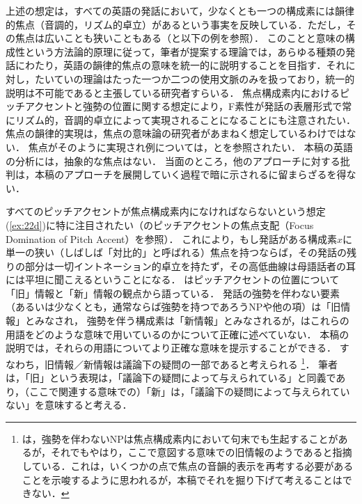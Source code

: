 \documentclass{goken}
\newcommand{\term}[2]{\textsf{#1}（#2）}
\newcommand{\ori}[1]{\noindent\textcolor[gray]{0.7}{\fontsize{8pt}{8pt}\selectfont{\textsf{(p.~#1)}}} }
\begin{document}
上述の想定は，すべての英語の発話において，少なくとも一つの構成素には韻律的焦点（音調的，リズム的卓立）があるという事実を反映している．ただし，その焦点は広いことも狭いこともある（\citealt{Ladd1980}と以下の例を参照）．
このことと意味の構成性という方法論的原理に従って，筆者が提案する理論では，あらゆる種類の発話にわたり，英語の韻律的焦点の意味を統一的に説明することを目指す．それに対し，たいていの理論はたった一つか二つの使用文脈のみを扱っており，統一的説明は不可能であると主張している研究者すらいる．
焦点構成素内におけるピッチアクセントと強勢の位置に関する想定により，F素性が発話の表層形式で常にリズム的，音調的卓立によって実現されることになることにも注意されたい．
焦点の韻律的実現は，焦点の意味論の研究者があまねく想定しているわけではない．
焦点がそのように実現され例については，\citealt{Partee1976}と\citealt{Krifka1992}を参照されたい．
本稿の英語の分析には，抽象的な焦点はない．
当面のところ，他のアプローチに対する批判は，本稿のアプローチを展開していく過程で暗に示されるに留まらざるを得ない．

すべてのピッチアクセントが焦点構成素内になければならないという想定(\ref{ex:22d})に特に注目されたい（\citet[282]{Selkirk1984}の\term{ピッチアクセントの焦点支配}{Focus Domination of Pitch Accent}を参照）．
これにより，もし発話がある構成素$x$に単一の狭い（しばしば「対比的」と呼ばれる）焦点を持つならば，その発話の残りの部分は一切イントネーション的卓立を持たず，その高低曲線は母語話者の耳には平坦に聞こえるということになる．
\citeauthor{Selkirk1984}はピッチアクセントの位置について「旧」情報と「新」情報の観点から語っている．
発話の強勢を伴わない要素（あるいは少なくとも，通常ならば強勢を持つであろうNPや他の項）は「旧情報」とみなされ，\ori{31}強勢を伴う構成素は「新情報」とみなされるが，\citeauthor{Selkirk1984}はこれらの用語をどのような意味で用いているのかについて正確に述べていない．
本稿の説明では，それらの用語についてより正確な意味を提示することができる．
すなわち，旧情報／新情報は議論下の疑問の一部であると考えられる
\footnote{%
  \citeauthor{Selkirk1984}は，強勢を伴わないNPは焦点構成素内において句末でも生起することがあるが，それでもやはり，ここで意図する意味での旧情報のようであると指摘している．これは，いくつかの点で焦点の音韻的表示を再考する必要があることを示唆するように思われるが，本稿でそれを掘り下げて考えることはできない．
}．
筆者は，「旧」という表現は，「議論下の疑問によって与えられている」と同義であり，（ここで関連する意味での）「新」は，「議論下の疑問によって与えられていない」を意味すると考える．
\end{document}
